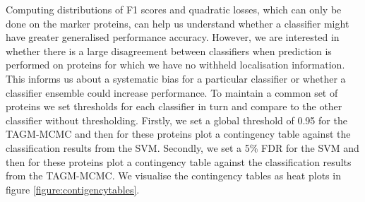 \documentclass[12pt,english]{article}\usepackage[]{graphicx}\usepackage[]{color}
\begin{document}
Computing distributions of F1 scores and quadratic losses, which can
only be done on the marker proteins, can help us understand whether a
classifier might have greater generalised performance
accuracy. However, we are interested in whether there is a large
disagreement between classifiers when prediction is performed on
proteins for which we have no withheld localisation information. This
informs us about a systematic bias for a particular classifier or
whether a classifier ensemble could increase performance. To maintain
a common set of proteins we set thresholds for each classifier in turn
and compare to the other classifier without thresholding. Firstly, we
set a global threshold of 0.95 for the TAGM-MCMC and then for these
proteins plot a contingency table against the classification results
from the SVM. Secondly, we set a 5\% FDR for the SVM and then for
these proteins plot a contingency table against the classification
results from the TAGM-MCMC. We visualise the contingency tables as
heat plots in figure \ref{figure:contigencytables}.
\end{document}
